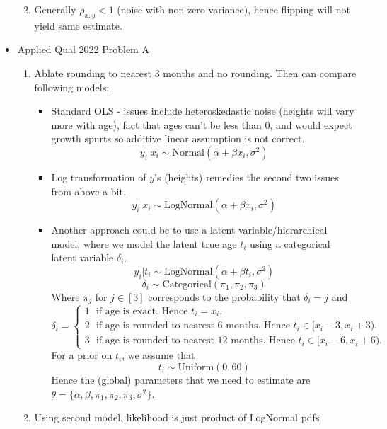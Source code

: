 \documentclass{article}
\begin{document}
\begin{itemize}
\begin{enumerate}[label=(\alph*)]
\begin{enumerate}[label=(\roman*)]
        \end{enumerate}
      \item Generally $\rho_{x, y} < 1$ (noise with non-zero variance), hence flipping will not yield same estimate.
    \end{enumerate}
  \item Applied Qual 2022 Problem A
    \begin{enumerate}[label=(\alph*)]
      \item Ablate rounding to nearest 3 months and no rounding. Then can compare following models:
        \begin{itemize}
          \item Standard OLS - issues include heteroskedastic noise (heights will vary more with age), fact that ages can't be less than 0, and would expect growth spurts so additive linear assumption is not correct.
            \[ y_i | x_i \sim \text{Normal}(\alpha + \beta x_i, \sigma^2) \]
          \item Log transformation of $y$'s (heights) remedies the second two issues from above a bit.
            \[ y_i | x_i \sim \text{LogNormal}(\alpha + \beta x_i, \sigma^2) \]
          \item Another approach could be to use a latent variable/hierarchical model, where we model the latent true age $t_i$ using a categorical latent variable $\delta_i$.
            \[ y_i | t_i \sim \text{LogNormal}(\alpha + \beta t_i, \sigma^2) \]
            \[ \delta_i \sim \text{Categorical}(\pi_1, \pi_2, \pi_3) \]
            Where $\pi_j$ for $j \in [3]$ corresponds to the probability that $\delta_i = j$ and
            \[\delta_i =
              \begin{cases}
                1 \ \ \ \text{if age is exact. Hence $t_i = x_i$.} \\
                2 \ \ \ \text{if age is rounded to nearest 6 months. Hence $t_i \in [x_i - 3, x_i + 3)$.} \\
                3 \ \ \ \text{if age is rounded to nearest 12 months. Hence $t_i \in [x_i - 6, x_i + 6)$.}
            \end{cases}\]
            For a prior on $t_i$, we assume that \[t_i \sim \text{Uniform}(0, 60)\]
            Hence the (global) parameters that we need to estimate are $\theta = \{\alpha, \beta,  \pi_1, \pi_2, \pi_3, \sigma^2 \}$.
        \end{itemize}
      \item Using second model, likelihood is just product of LogNormal pdfs
        \begin{align*}

\end{align*}
\end{enumerate}
\end{itemize}
\end{document}
